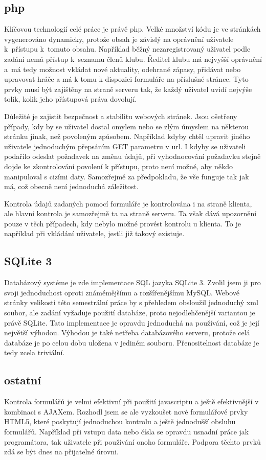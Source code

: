 \documentclass[12pt]{article}
\begin{document}
\subsection{php}
Klíčovou technologií celé práce je právě php. Velké množství kódu je ve
stránkách vygenerováno dynamicky, protože obsah je závislý na oprávnění
uživatele k~přístupu k~tomuto obsahu. Například běžný nezaregistrovaný uživatel
podle zadání nemá přístup k~seznamu členů klubu. Ředitel klubu má nejvyšší
oprávnění a~má tedy možnost vkládat nové aktuality, odehrané zápasy, přidávat
nebo upravovat hráče a má k tomu k dispozici formuláře na příslušné stránce.
Tyto prvky musí být zajištěny na straně serveru tak, že každý uživatel uvidí
nejvýše tolik, kolik jeho přístupová práva dovolují.

Důležité je zajistit bezpečnost a stabilitu webových stránek. Jsou ošetřeny
případy, kdy by se uživatel dostal omylem nebo se zlým úmyslem na některou
stránku jinak, než povoleným způsobem. Například kdyby chtěl upravit jiného
uživatele jednoduchým přepsáním GET parametru v url. I kdyby se uživateli
podařilo odeslat požadavek na změnu údajů, při vyhodnocování požadavku stejně
dojde ke zkontrolování povolení k přístupu, proto není možné, aby někdo
manipuloval s cizími daty. Samozřejmě za předpokladu, že vše funguje tak jak
má, což obecně není jednoduchá záležitost.

Kontrola údajů zadaných pomocí formuláře je kontrolována i na straně klienta,
ale hlavní kontrola je samozřejmě ta na straně serveru. Ta však dává upozornění
pouze v těch případech, kdy nebylo možné provést kontrolu u klienta. To je
například při vkládání uživatele, jestli již takový existuje.

\subsection{SQLite 3}
Databázový systéme je zde implementace SQL jazyka SQLite 3. Zvolil jsem ji pro
svoji jednoduchost oproti známémějšímu a rozšířenějšímu MySQL. Webové stránky
velikosti této semestrální práce by s přehledem obsloužil jednoduchý xml
soubor, ale zadání vyžaduje použití databáze, proto nejodlehčenější variantou
je právě SQLite. Tato implementace je opravdu jednoduchá na používání, což je
její největší výhodou. Výhodou je také netřeba databázového serveru, protože
celá databáze je po celou dobu uložena v jediném souboru. Přenositelnost
databáze je tedy zcela triviální.

\subsection{ostatní}
Kontrola formulářů je velmi efektivní při použití javascriptu a ještě
efektivnější v kombinaci s AJAXem. Rozhodl jsem se ale vyzkoušet nové
formulářové prvky HTML5, které poskytují jednoduchou kontrolu a ještě
jednodušší obsluhu formulářů. Například při vstupu data nebo čísla se opravdu
usnadní práce jak programátora, tak uživatele při používání onoho formuláře.
Podpora těchto prvků zdá se být dnes na přijatelné úrovni.
\end{document}
